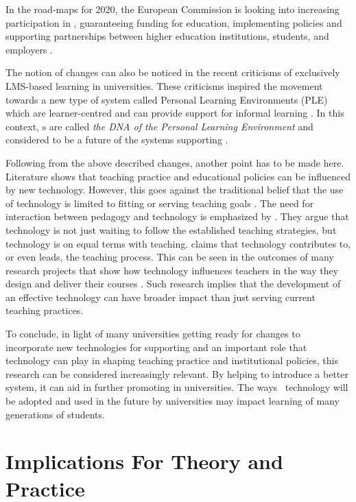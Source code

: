 In the road-maps for 2020, the European Commission is looking into increasing
participation in \LLLsn, guaranteeing funding for education, implementing \LLLs
policies and supporting partnerships between higher education institutions,
students, and employers \citep{EuropeanCommission2010,EuropeanUnion2009}.

The notion of changes can also be noticed in the recent criticisms of
exclusively LMS-based learning in universities. These criticisms inspired the
movement towards a new type of system called Personal Learning Environments
(PLE) which are learner-centred and can provide support for informal learning
\citep{Calvani2007}. In this context, \ep s are called \textit{the DNA of the
Personal Learning Environment} and considered to be a future of the systems
supporting \LLLs \citet{Attwell2007a}.

Following from the above described changes, another point has to be made here.
Literature shows that teaching practice and educational policies can be
influenced by new technology. However, this goes against the traditional belief
that the use of technology is limited to fitting or serving teaching goals
\citep{Levin2008}. The need for interaction between pedagogy and technology is
emphasized by \citet{Savin-Baden2006}. They argue that technology is not just
waiting to follow the established teaching strategies, but technology is on
equal terms with teaching. \citet{Cousin2005} claims that technology contributes
to, or even leads, the teaching process. This can be seen in the outcomes of
many research projects that show how technology influences teachers in the way
they design and deliver their courses \citep{Rutledge2012,Wang2002}. Such
research implies that the development of an effective technology can have
broader impact than just serving current teaching practices.

To conclude, in light of many universities getting ready for changes to
incorporate new technologies for supporting \LLLs and an important role that
technology can play in shaping teaching practice and institutional policies,
this research can be considered increasingly relevant. By helping to introduce a
better system, it can aid in further promoting \LLLs in universities. The ways
\ep~technology will be adopted and used in the future by universities may impact
learning of many generations of students.

\section{Implications For Theory and Practice}


